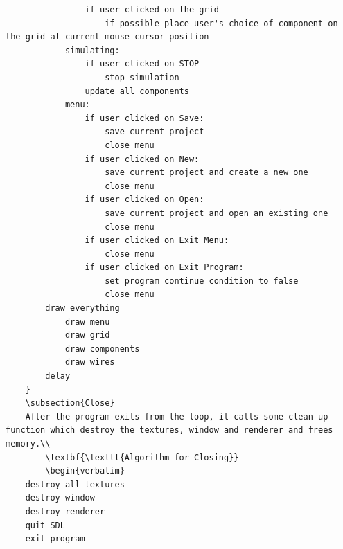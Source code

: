 \documentclass[report]{subfiles}
\begin{document}
\begin{verbatim}
                if user clicked on the grid
                    if possible place user's choice of component on the grid at current mouse cursor position
            simulating:
                if user clicked on STOP
                    stop simulation
                update all components
            menu:
                if user clicked on Save:
                    save current project
                    close menu
                if user clicked on New:
                    save current project and create a new one
                    close menu
                if user clicked on Open:
                    save current project and open an existing one
                    close menu
                if user clicked on Exit Menu:
                    close menu
                if user clicked on Exit Program:
                    set program continue condition to false 
                    close menu
        draw everything
            draw menu
            draw grid
            draw components
            draw wires
        delay
    }
    \subsection{Close}
    After the program exits from the loop, it calls some clean up function which destroy the textures, window and renderer and frees memory.\\
        \textbf{\texttt{Algorithm for Closing}}
        \begin{verbatim}
    destroy all textures
    destroy window
    destroy renderer
    quit SDL
    exit program
        \end{verbatim}
\end{document}
